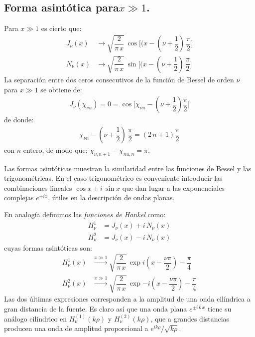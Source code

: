 \subsection{Forma asintótica para\texorpdfstring{$x \gg 1$}{x >> 1}.}

Para $x \gg 1$ es cierto que:
\begin{align*}
J_{\nu} (x) &\to \sqrt{\dfrac{2}{\pi \, x}} \, \cos \bigg[( x - \left( \nu + \dfrac{1}{2} \right) \, \dfrac{\pi}{2} \bigg] \\[0.5em]
N_{\nu} (x) &\to \sqrt{\dfrac{2}{\pi \, x}} \, \sin \bigg[( x - \left( \nu + \dfrac{1}{2} \right) \, \dfrac{\pi}{2} \bigg]
\end{align*}
La separación entre dos ceros consecutivos de la función de Bessel de orden $\nu$ para $x \gg 1$ se obtiene de:
\begin{align*}
J_{\nu}(\chi_{\nu n}) = 0 = \cos \bigg[ \chi_{\nu n} - \left( \nu + \dfrac{1}{2} \right) \dfrac{\pi}{2} \bigg]
\end{align*}
de donde:
\begin{align*}
\chi_{\nu n} - \left( \nu + \dfrac{1}{2} \right) \, \dfrac{\pi}{2} = (2 \, n + 1) \dfrac{\pi}{2}
\end{align*}
con $n$ entero, de modo que: $\chi_{\nu, n+1} - \chi_{nu,n} = \pi$.
\par
Las formas asintóticas muestran la similaridad entre las funciones de Bessel y las trigonométricas. En el caso trigonométrico es conveniente introducir las combinaciones lineales $\cos x \pm i \, \sin x$ que dan lugar a las exponenciales complejas $e^{\pm i x}$, útiles en la descripción de ondas planas. 
\par
En analogía  definimos las \emph{funciones de Hankel} como:
\begin{align*}
H_{\nu}^{1} &= J_{\nu} (x) + i \, N_{\nu} (x) \\[0.5em]
H_{\nu}^{2} &= J_{\nu} (x) - i \, N_{\nu} (x)  
\end{align*}
cuyas formas asintóticas son:
\begin{align*}
H_{\nu}^{1}(x) & \xrightarrow{\text{$x \gg 1$}} \sqrt{\dfrac{2}{\pi \, x}} \, \exp{i \left( x - \dfrac{\nu \pi}{2}\right) - \dfrac{\pi}{4}} \\
H_{\nu}^{2}(x) & \xrightarrow{\text{$x \gg 1$}} \sqrt{\dfrac{2}{\pi \, x}} \, \exp{-i \left(x - \dfrac{\nu \pi}{2} \right) - \dfrac{\pi}{4}} 
\end{align*}
Las dos últimas expresiones corresponden a la amplitud de una onda cilíndrica a gran distancia de la fuente. Es claro así que una onda plana $e^{\pm i \, k \, x}$ tiene su análogo cilíndrico en $H_{\nu}^{(1)} (k \rho)$ y $H_{\nu}^{(2)} (k \rho)$, que a grandes distancias producen una onda de amplitud proporcional a $e^{i k \rho} / \sqrt{k \rho}$.
